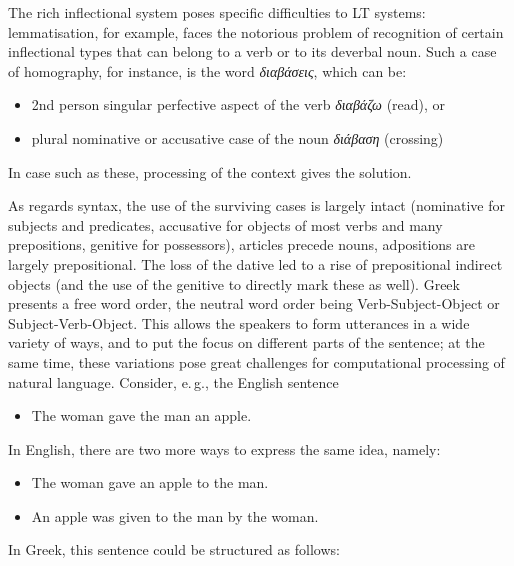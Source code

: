 \documentclass[]{../../metanetpaper}
\begin{document}
\begin{multicols}{2}

The rich inflectional system poses specific difficulties to LT systems: lemmatisation, for example, faces the notorious problem of recognition of certain inflectional types that can belong to a verb or to its deverbal noun. Such a case of homography, for instance, is the word \textit{διαβάσεις}, which can be:

\begin{itemize}    
\item 2nd person singular perfective aspect of the verb \textit{διαβάζω} (read), or
\item plural nominative or accusative case of the noun \textit{διάβαση} (crossing)
\end{itemize}

In case such as these, processing of the context gives the solution.
   
As regards syntax, the use of the surviving cases is largely intact (nominative for subjects and predicates, accusative for objects of most verbs and many prepositions, genitive for possessors), articles precede nouns, adpositions are largely prepositional. The loss of the dative led to a rise of prepositional indirect objects (and the use of the genitive to directly mark these as well). Greek presents a free word order, the neutral word order being Verb-Subject-Object or Subject-Verb-Object. This allows the speakers to form utterances in a wide variety of ways, and to put the focus on different parts of the sentence; at the same time, these variations pose great challenges for computational processing of natural language. Consider, e.\,g., the English sentence

\begin{itemize}    
\item[] The woman gave the man an apple.
\end{itemize}

In English, there are two more ways to express the same idea, namely:

\begin{itemize}    
\item The woman gave an apple to the man.
\item An apple was given to the man by the woman.
\end{itemize}

In Greek, this sentence could be structured as follows:


\end{multicols}
\end{document}
